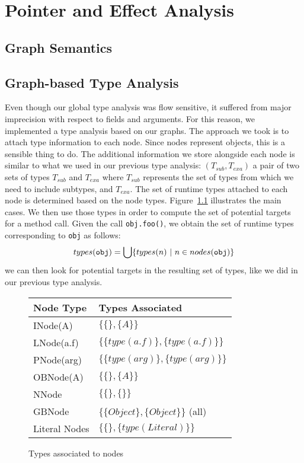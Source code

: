 \chapter{Pointer and Effect Analysis}
\label{chap:pointer}

\section{Graph Semantics}

\section{Graph-based Type Analysis}
Even though our global type analysis was flow sensitive, it suffered from major
imprecision with respect to fields and arguments. For this reason, we
implemented a type analysis based on our graphs. The approach we took is to
attach type information to each node. Since nodes represent objects, this is a
sensible thing to do. The additional information we store alongside each node
is similar to what we used in our previous type analysis: $(T_{sub}, T_{exa})$
a pair of two sets of types $T_{sub}$ and $T_{exa}$ where $T_{sub}$ represents
the set of types from which we need to include subtypes, and $T_{exa}$.
The set of runtime types attached to each node is determined based on the node
types. Figure~\ref{fig:pt:types} illustrates the main cases. We then use those
types in order to compute the set of potential targets for a method call. Given
the call \verb/obj.foo()/, we obtain the set of runtime types corresponding to
\verb/obj/ as follows:
$$
    types(\verb/obj/) = \bigcup \{ types(n) ~|~ n \in nodes(\verb/obj/) \}
$$
we can then look for potential targets in the resulting set of types, like we
did in our previous type analysis.


\begin{figure}[h]
    \centering

    \begin{tabular}{ l | l }
        Node Type & Types Associated \\
        \hline
        INode(A)           & $\{\{\}, \{A\}\}$ \\
        LNode(a.f)         & $\{\{type(a.f)\}, \{type(a.f)\}\}$ \\
        PNode(arg)         & $\{\{type(arg)\}, \{type(arg)\}\}$ \\
        OBNode(A)          & $\{\{\},   \{A\}\}$ \\
        NNode              & $\{\{\},   \{\}\}$ \\
        GBNode             & $\{\{Object\},   \{Object\}\}$ (all)\\
        Literal Nodes      & $\{\{\},   \{type(Literal)\}\}$\\
    \end{tabular}

    \caption{Types associated to nodes}
    \label{fig:pt:types}
\end{figure}

